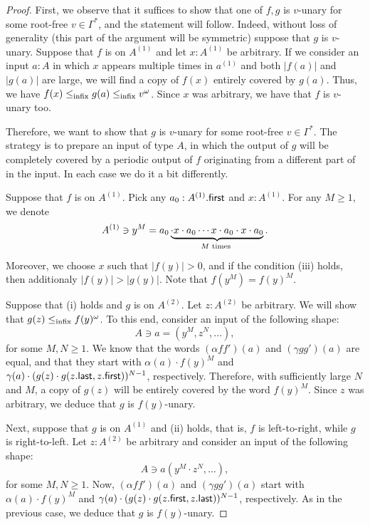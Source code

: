 \begin{proof}
    First, we observe that it suffices to show that one of $f,g$ is $v$-unary for some root-free $v \in \Gamma^*$, and the statement will follow. Indeed, without loss of generality (this part of the argument will be symmetric) suppose that $g$ is $v$-unary. Suppose that $f$ is on $A^{(1)}$ and let $x : A^{(1)}$ be arbitrary. If we consider an input $a : A$ in which $x$ appears multiple times in $a^{(1)}$ and both $|f(a)|$ and $|g(a)|$ are large, we will find a copy of $f(x)$ entirely covered by $g(a)$. Thus, we have $f(x) \leq_{\mathrm{infix}} g(a) \leq_{\mathrm{infix}} v^\omega$. Since $x$ was arbitrary, we have that $f$ is $v$-unary too.

    Therefore, we want to show that $g$ is $v$-unary for some root-free $v \in \Gamma^*$. The strategy is to prepare an input of type $A$, in which the output of $g$ will be completely covered by a periodic output of $f$ originating from a different part of in the input. In each case we do it a bit differently.

    Suppose that $f$ is on $A^{(1)}$. Pick any $a_0 : A^{(1)} . \mathsf{first}$ and $x : A^{(1)}$. For any $M \geq 1$, we denote
    \[
        A^{(1)} \ni y^M = a_0 \myunderbrace{\cdot x \cdot a_0 \cdots x \cdot a_0 \cdot x \cdot a_0}{\text{$M$ times}}.
    \]
    Moreover, we choose $x$ such that $|f(y)| > 0$, and if the condition (iii) holds, then additionaly $|f(y)| > |g(y)|$. Note that $f(y^M) = f(y)^M$.

    Suppose that (i) holds and $g$ is on $A^{(2)}$. Let $z : A^{(2)}$ be arbitrary. We will show that $g(z) \leq_{\mathrm{infix}} f(y)^\omega$. To this end, consider an input of the following shape:
    \[
        A \ni a = \left( y^M, z^N, \dots \right),
    \]
    for some $M, N \geq 1$. We know that the words $(\alpha f f')(a)$ and $(\gamma g g')(a)$ are equal, and that they start with $\alpha(a) \cdot f(y)^M$ and $\gamma(a) \cdot (g(z) \cdot g(z . \mathsf{last}, z . \mathsf{first}))^{N-1}$, respectively. Therefore, with sufficiently large $N$ and $M$, a copy of $g(z)$ will be entirely covered by the word $f(y)^M$. Since $z$ was arbitrary, we deduce that $g$ is $f(y)$-unary.

    Next, suppose that $g$ is on $A^{(1)}$ and (ii) holds, that is, $f$ is left-to-right, while $g$ is right-to-left. Let $z : A^{(2)}$ be arbitrary and consider an input of the following shape:
    \[
        A \ni a \left( y^M \cdot z^N, \dots \right),
    \]
    for some $M, N \geq 1$. Now, $(\alpha f f')(a)$ and $(\gamma g g')(a)$ start with $\alpha(a) \cdot f(y)^M$ and $\gamma(a) \cdot (g(z) \cdot g(z . \mathsf{first}, z . \mathsf{last}))^{N-1}$, respectively. As in the previous case, we deduce that $g$ is $f(y)$-unary.


\end{proof}
